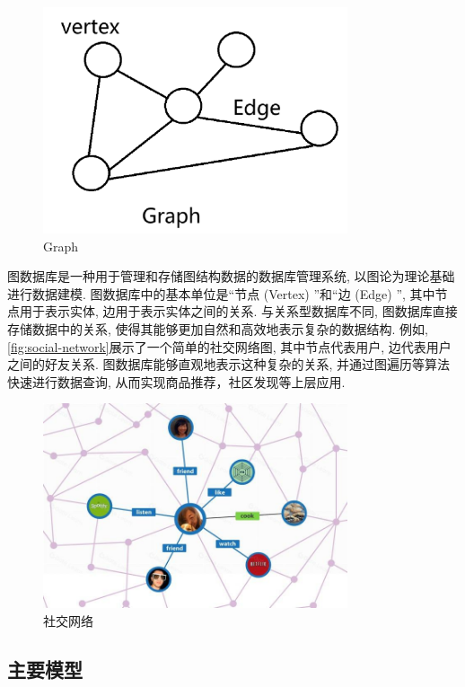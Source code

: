 \documentclass[12pt,hyperref,a4paper,UTF8]{ctexart}
\begin{document}
\begin{figure}[H]
	\centering
	\includegraphics[width=0.8\textwidth]{images/7.png}
	\caption{Graph}
	\label{fig:graph}
\end{figure}
图数据库是一种用于管理和存储图结构数据的数据库管理系统, 以图论为理论基础进行数据建模. 图数据库中的基本单位是“节点 (Vertex) ”和“边 (Edge) ”, 其中节点用于表示实体, 边用于表示实体之间的关系. 与关系型数据库不同, 图数据库直接存储数据中的关系, 使得其能够更加自然和高效地表示复杂的数据结构. 例如, \autoref{fig:social-network}展示了一个简单的社交网络图, 其中节点代表用户, 边代表用户之间的好友关系. 图数据库能够直观地表示这种复杂的关系, 并通过图遍历等算法快速进行数据查询, 从而实现商品推荐，社区发现等上层应用.
\begin{figure}[H]
	\centering
	\includegraphics[width=0.8\textwidth]{images/8.png}
	\caption{社交网络}
	\label{fig:social-network}
\end{figure}


\subsection{主要模型}
\end{document}
